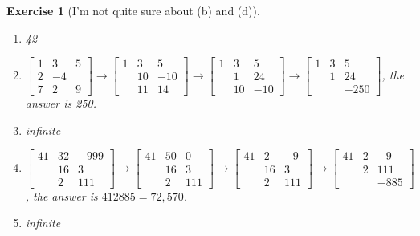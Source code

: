\documentclass{article}
\theoremstyle{breakstyle}
\newtheorem{exercise}{Exercise}[section]
\begin{document}
\begin{exercise}[I'm not quite sure about (b) and (d)]
    \leavevmode \vspace{-\baselineskip}
    \begin{enumerate}[label=\alph*)]
        \item 42

        \item $\begin{bmatrix}
                1 & 3 & 5\\
                2 & -4 & \\
                7 & 2 & 9
                \end{bmatrix} \rightarrow \begin{bmatrix}
                1 & 3 & 5\\
                  & 10 & -10\\
                  & 11 & 14
                \end{bmatrix} \rightarrow \begin{bmatrix}
                1 & 3 & 5\\
                  & 1 & 24\\
                  & 10 & -10
                \end{bmatrix} \rightarrow \begin{bmatrix}
                1 & 3 & 5\\
                  & 1 & 24\\
                  &  & -250
            \end{bmatrix}$, the answer is 250.

        \item infinite

        \item $\begin{bmatrix}
                41 & 32 & -999\\
                   & 16 & 3\\
                   & 2 & 111
                \end{bmatrix} \rightarrow \begin{bmatrix}
                41 & 50 & 0\\
                   & 16 & 3\\
                   & 2 & 111
                \end{bmatrix} \rightarrow \begin{bmatrix}
                41 & 2 & -9\\
                   & 16 & 3\\
                   & 2 & 111
                \end{bmatrix} \rightarrow \begin{bmatrix}
                41 & 2 & -9\\
                   & 2 & 111\\
                   &  & -885
            \end{bmatrix}$, the answer is $412885 = 72,570$.

        \item infinite
    \end{enumerate}
\end{exercise}
\end{document}
